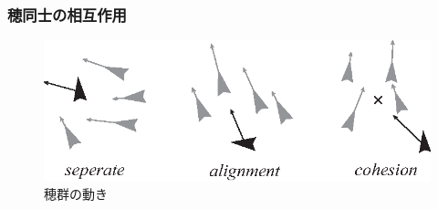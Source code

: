 \documentclass[twocolumn]{jarticle}
\begin{document}
        \subsubsection{穂同士の相互作用}

        \begin{figure}[t]
            \centering
            \includegraphics[width=\linewidth]{fig/flocking.eps}
            \caption{穂群の動き}
            \label{fig:flocking}
        \end{figure}
\end{document}
